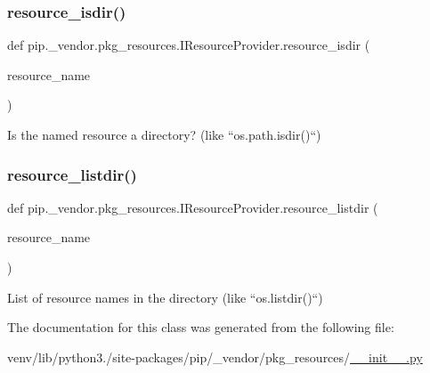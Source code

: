 \subsubsection{\texorpdfstring{resource\+\_\+isdir()}{resource\_isdir()}}
{\footnotesize\ttfamily def pip.\+\_\+vendor.\+pkg\+\_\+resources.\+I\+Resource\+Provider.\+resource\+\_\+isdir (\begin{DoxyParamCaption}\item[{}]{resource\+\_\+name }\end{DoxyParamCaption})}

\begin{DoxyVerb}Is the named resource a directory?  (like ``os.path.isdir()``)\end{DoxyVerb}
 \mbox{\label{classpip_1_1__vendor_1_1pkg__resources_1_1IResourceProvider_a063a75ac43a3f311eddae86f2a69c323}} 
\subsubsection{\texorpdfstring{resource\+\_\+listdir()}{resource\_listdir()}}
{\footnotesize\ttfamily def pip.\+\_\+vendor.\+pkg\+\_\+resources.\+I\+Resource\+Provider.\+resource\+\_\+listdir (\begin{DoxyParamCaption}\item[{}]{resource\+\_\+name }\end{DoxyParamCaption})}

\begin{DoxyVerb}List of resource names in the directory (like ``os.listdir()``)\end{DoxyVerb}
 

The documentation for this class was generated from the following file\+:\begin{DoxyCompactItemize}
\item 
venv/lib/python3./site-\/packages/pip/\+\_\+vendor/pkg\+\_\+resources/\hyperlink{venv_2lib_2python3_89_2site-packages_2pip_2__vendor_2pkg__resources_2____init_____8py}{\+\_\+\+\_\+init\+\_\+\+\_\+.\+py}\end{DoxyCompactItemize}
